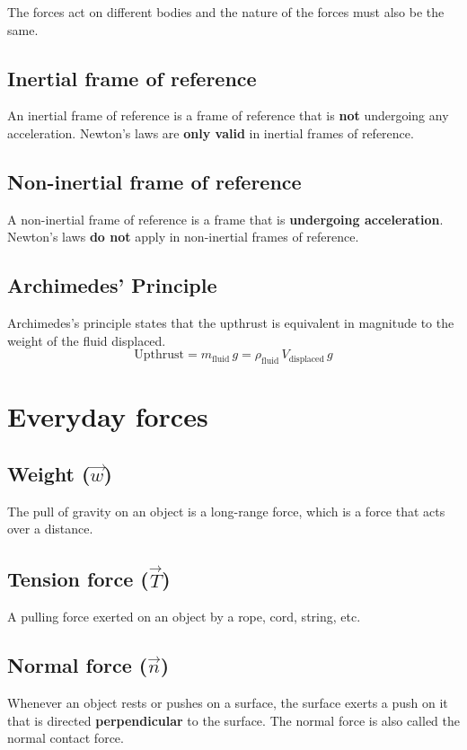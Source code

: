 \documentclass[11pt]{article}
\begin{document}
The forces act on different bodies and the nature of the forces must also be the same.

\subsection{Inertial frame of reference}
\label{sec:orgc448273}
An inertial frame of reference is a frame of reference that is \textbf{not} undergoing any acceleration. Newton's laws are \textbf{only valid} in inertial frames of reference.

\subsection{Non-inertial frame of reference}
\label{sec:orgfcc3d74}
A non-inertial frame of reference is a frame that is \textbf{undergoing acceleration}. Newton's laws \textbf{do not} apply in non-inertial frames of reference.

\subsection{Archimedes' Principle}
\label{sec:org80e430c}
Archimedes's principle states that the upthrust is equivalent in magnitude to the weight of the fluid displaced.
\[\text{Upthrust} = m_{\text{fluid}} \, g = \rho_{\text{fluid}} \, V_{\text{displaced}} \, g\]

\section{Everyday forces}
\label{sec:orgb552ff0}

\subsection{Weight (\(\vec{w}\))}
\label{sec:org9afd3f0}
The pull of gravity on an object is a long-range force, which is a force that acts over a distance.

\subsection{Tension force (\(\vec{T}\))}
\label{sec:orgb58f955}
A pulling force exerted on an object by a rope, cord, string, etc.

\subsection{Normal force (\(\vec{n}\))}
\label{sec:orgd18c80e}
Whenever an object rests or pushes on a surface, the surface exerts a push on it that is directed \textbf{perpendicular} to the surface. The normal force is also called the normal contact force.
\end{document}
